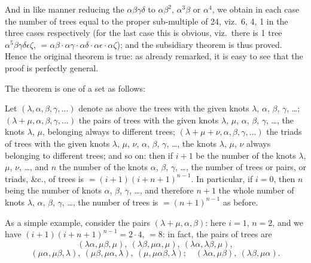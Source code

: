 \documentclass[11pt,a4paper]{book}
\begin{document}
And in like manner reducing the $\alpha\beta\gamma\delta$ to $\alpha\beta^2$, $\alpha^3\beta$ or $\alpha^4$, we obtain in each case the number of trees equal to the proper sub-multiple of 24, viz.\ 6, 4, 1 in the three cases respectively (for the last case this is obvious, viz.\ there is 1 tree $\alpha^5\beta\gamma\delta\epsilon\zeta$, $= \alpha\beta \cdot \alpha\gamma \cdot \alpha\delta \cdot \alpha\epsilon \cdot \alpha\zeta$); and the subsidiary theorem is thus proved. Hence the original theorem is true: as already remarked, it is easy to see that the proof is perfectly general.

The theorem is one of a set as follows:

Let $(\lambda, \alpha, \beta, \gamma, \ldots)$ denote as above the trees with the given knots $\lambda$, $\alpha$, $\beta$, $\gamma$, \ldots; $(\lambda + \mu, \alpha, \beta, \gamma, \ldots)$ the pairs of trees with the given knots $\lambda$, $\mu$, $\alpha$, $\beta$, $\gamma$, \ldots, the knots $\lambda$, $\mu$, belonging always to different trees; $(\lambda + \mu + \nu, \alpha, \beta, \gamma, \ldots)$ the triads of trees with the given knots $\lambda$, $\mu$, $\nu$, $\alpha$, $\beta$, $\gamma$, \ldots, the knots $\lambda$, $\mu$, $\nu$ always belonging to different trees; and so on: then if $i + 1$ be the number of the knots $\lambda$, $\mu$, $\nu$, \ldots, and $n$ the number of the knots $\alpha$, $\beta$, $\gamma$, \ldots, the number of trees or pairs, or triads, \&c., of trees is $= (i + 1)(i + n + 1)^{n-1}$. In particular, if $i = 0$, then $n$ being the number of knots $\alpha$, $\beta$, $\gamma$, \ldots, and therefore $n + 1$ the whole number of knots $\lambda$, $\alpha$, $\beta$, $\gamma$, \ldots, the number of trees is $= (n + 1)^{n-1}$ as before.

As a simple example, consider the pairs $(\lambda + \mu, \alpha, \beta)$: here $i = 1$, $n = 2$, and we have $(i + 1)(i + n + 1)^{n-1} = 2 \cdot 4$, $=8$: in fact, the pairs of trees are
\[
(\lambda\alpha, \mu\beta, \mu),\ (\lambda\beta, \mu\alpha, \mu),\ (\lambda\alpha, \lambda\beta, \mu),
\]
\[
(\mu\alpha, \mu\beta, \lambda),\ (\mu\beta, \mu\alpha, \lambda),\ (\mu, \mu\alpha\beta, \lambda);\quad (\lambda\alpha, \mu\beta),\ (\lambda\beta, \mu\alpha).
\]
\end{document}
